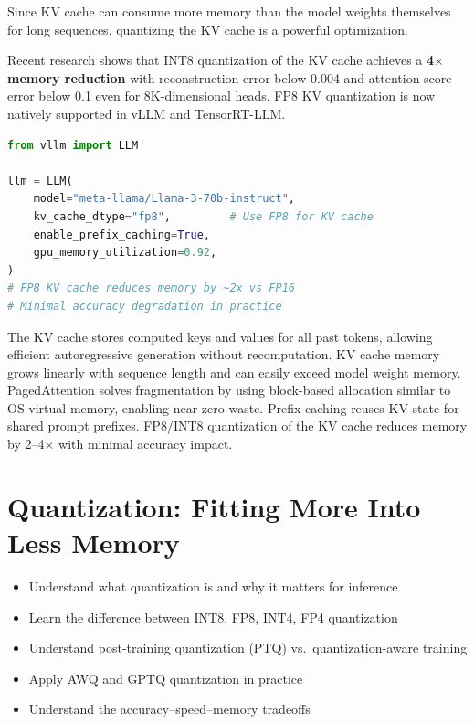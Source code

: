 \documentclass[10pt, oneside, openany]{book}
\newenvironment{learningobjectives}
  {\begin{tcolorbox}[enhanced, breakable,
    colback={rgb,255:red,232;green,240;blue,255},
    colframe=NavyBlue, boxrule=1.5pt, arc=4pt,
    title={\bfseries Learning Objectives},
    fonttitle=\bfseries\color{white},
    attach boxed title to top left={yshift=-2mm, xshift=5mm},
    boxed title style={colback=NavyBlue, arc=2pt}]
  \begin{itemize}[leftmargin=1.5em, itemsep=2pt]}
  {\end{itemize}\end{tcolorbox}}
\newenvironment{chapsummary}
  {\begin{tcolorbox}[enhanced, breakable,
    colback={rgb,255:red,245;green,245;blue,225},
    colframe=AccentOrange, boxrule=1.5pt, arc=4pt,
    title={\bfseries Chapter Summary},
    fonttitle=\bfseries\color{white},
    attach boxed title to top left={yshift=-2mm, xshift=5mm},
    boxed title style={colback=AccentOrange, arc=2pt}]}
  {\end{tcolorbox}}
\begin{document}
Since KV cache can consume more memory than the model weights themselves for long
sequences, quantizing the KV cache is a powerful optimization.

Recent research shows that INT8 quantization of the KV cache achieves a
\textbf{4$\times$ memory reduction} with reconstruction error below 0.004 and
attention score error below 0.1 even for 8K-dimensional heads.  FP8 KV
quantization is now natively supported in vLLM and TensorRT-LLM.

\begin{lstlisting}[language=Python, caption={FP8 KV cache quantization in vLLM}]
from vllm import LLM

llm = LLM(
    model="meta-llama/Llama-3-70b-instruct",
    kv_cache_dtype="fp8",         # Use FP8 for KV cache
    enable_prefix_caching=True,
    gpu_memory_utilization=0.92,
)
# FP8 KV cache reduces memory by ~2x vs FP16
# Minimal accuracy degradation in practice
\end{lstlisting}

\begin{chapsummary}
The KV cache stores computed keys and values for all past tokens, allowing
efficient autoregressive generation without recomputation.  KV cache memory
grows linearly with sequence length and can easily exceed model weight memory.
PagedAttention solves fragmentation by using block-based allocation similar to
OS virtual memory, enabling near-zero waste.  Prefix caching reuses KV state
for shared prompt prefixes.  FP8/INT8 quantization of the KV cache reduces
memory by 2--4$\times$ with minimal accuracy impact.
\end{chapsummary}

\chapter{Quantization: Fitting More Into Less Memory}
\label{ch:quantization}

\begin{learningobjectives}
  \item Understand what quantization is and why it matters for inference
  \item Learn the difference between INT8, FP8, INT4, FP4 quantization
  \item Understand post-training quantization (PTQ) vs.\ quantization-aware training
  \item Apply AWQ and GPTQ quantization in practice
  \item Understand the accuracy--speed--memory tradeoffs
\end{learningobjectives}
\end{document}
